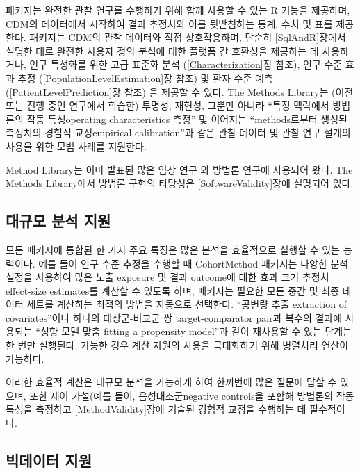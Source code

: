 \documentclass[10.5pt]{book}
\theoremstyle{definition}
\theoremstyle{definition}
\theoremstyle{definition}
\theoremstyle{remark}
\begin{document}
패키지는 완전한 관찰 연구를 수행하기 위해 함께 사용할 수 있는 R 기능을
제공하며, CDM의 데이터에서 시작하여 결과 추정치와 이를 뒷받침하는 통계,
수치 및 표를 제공한다. 패키지는 CDM의 관찰 데이터와 직접 상호작용하며,
단순히 \ref{SqlAndR}장에서 설명한 대로 완전한 사용자 정의 분석에 대한
플랫폼 간 호환성을 제공하는 데 사용하거나, 인구 특성화를 위한 고급
표준화 분석 (\ref{Characterization}장 참조), 인구 수준 효과 추정
(\ref{PopulationLevelEstimation}장 참조) 및 환자 수준 예측
(\ref{PatientLevelPrediction}장 참조) 을 제공할 수 있다. The Methods
Library는 (이전 또는 진행 중인 연구에서 학습한) 투명성, 재현성, 그뿐만
아니라 ``특정 맥락에서 방법론의 작동 특성operating characteristics
측정'' 및 이어지는 ``methods로부터 생성된 측정치의 경험적 교정empirical
calibration''과 같은 관찰 데이터 및 관찰 연구 설계의 사용을 위한 모범
사례를 지원한다.

Method Library는 이미 발표된 많은 임상 연구
\citep{boland_2017, duke_2017, ramcharran_2017, weinstein_2017, wang_2017, ryan_2017, ryan_2018, vashisht_2018, yuan_2018, johnston_2019}와
방법론 연구에 사용되어 왔다.
\citep{schuemie_2014, schuemie_2016, reps2018, tian_2018, schuemie_2018, schuemie_2018b, reps_2019}
The Methods Library에서 방법론 구현의 타당성은
\ref{SoftwareValidity}장에 설명되어 있다.

\subsection{대규모 분석 지원}\label{--}

모든 패키지에 통합된 한 가지 주요 특징은 많은 분석을 효율적으로 실행할
수 있는 능력이다. 예를 들어 인구 수준 추정을 수행할 때 CohortMethod
패키지는 다양한 분석 설정을 사용하여 많은 노출 exposure 및 결과
outcome에 대한 효과 크기 추정치 effect-size estimates를 계산할 수 있도록
하며, 패키지는 필요한 모든 중간 및 최종 데이터 세트를 계산하는 최적의
방법을 자동으로 선택한다. ``공변량 추출 extraction of covariates''이나
하나의 대상군-비교군 쌍 target-comparator pair과 복수의 결과에 사용되는
``성향 모델 맞춤 fitting a propensity model''과 같이 재사용할 수 있는
단계는 한 번만 실행된다. 가능한 경우 계산 자원의 사용을 극대화하기 위해
병렬처리 연산이 가능하다.

이러한 효율적 계산은 대규모 분석을 가능하게 하여 한꺼번에 많은 질문에
답할 수 있으며, 또한 제어 가설(예를 들어, 음성대조군negative controls을
포함해 방법론의 작동 특성을 측정하고 \ref{MethodValidity}장에 기술된
경험적 교정을 수행하는 데 필수적이다. 

\subsection{빅데이터 지원}\label{BigDataSupport}
\end{document}

